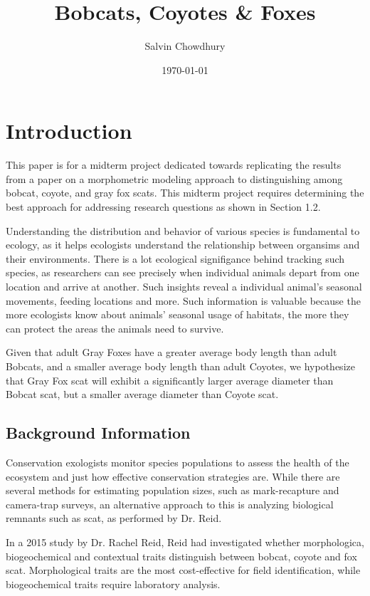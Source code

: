\documentclass[a4paper]{article}
\title{Bobcats, Coyotes \& Foxes}
\author{Salvin Chowdhury}
\date{\today}
\begin{document}
\setlength{\intextsep}{0pt} 
\setlength{\textfloatsep}{5pt} 

\maketitle
\tableofcontents
\newpage

\section{Introduction}
This paper is for a midterm project dedicated towards replicating the results from a paper on a morphometric modeling approach to distinguishing among
bobcat, coyote, and gray fox scats. This midterm project requires determining the best approach for addressing research questions as shown in Section 1.2.

Understanding the distribution and behavior of various species is fundamental to ecology, as it helps ecologists understand the relationship between
organsims and their environments. There is a lot ecological signifigance behind tracking such species, as researchers can see precisely when individual 
animals depart from one location and arrive at another. Such insights reveal a individual animal's seasonal movements, feeding locations and more. Such
information is valuable because the more ecologists know about animals' seasonal usage of habitats, the more they can protect the areas the animals need to
survive.

Given that adult Gray Foxes have a greater average body length than adult Bobcats, and a smaller average body length than adult Coyotes, we hypothesize 
that Gray Fox scat will exhibit a significantly larger average diameter than Bobcat scat, but a smaller average diameter than Coyote scat.

\subsection{Background Information}
Conservation exologists monitor species populations to assess the health of the ecosystem and just how effective conservation strategies are. While there are
several methods for estimating population sizes, such as mark-recapture and camera-trap surveys, an alternative approach to this is analyzing biological 
remnants such as scat, as performed by Dr. Reid.

In a 2015 study by Dr. Rachel Reid, Reid had investigated whether morphologica, biogeochemical and contextual traits distinguish between bobcat, coyote and
fox scat. Morphological traits are the most cost-effective for field identification, while biogeochemical traits require laboratory analysis. 
\end{document}
